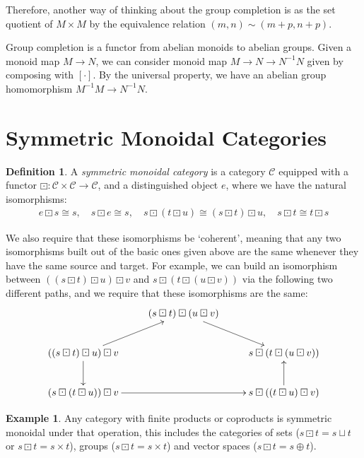 \documentclass[10pt,a4paper]{article}
\theoremstyle{definition}
\newtheorem{example}[theorem]{Example}
\newtheorem{definition}[theorem]{Definition}
\begin{document}
Therefore, another way of thinking about the group completion is as the set quotient of $M \times M$ by the equivalence relation $(m, n) \sim (m + p, n + p)$.

Group completion is a functor from abelian monoids to abelian groups. Given a monoid map $M \to N$, we can consider monoid map $M \to N \to N^{-1} N$ given by composing with $[\cdot]$. By the universal property, we have an abelian group homomorphism $M^{-1}M\to N^{-1}N$.

\section{Symmetric Monoidal Categories}
\begin{definition}
A \emph{symmetric monoidal category} is a category $\mathcal{C}$ equipped with a functor $\boxdot : \mathcal{C} \times \mathcal{C} \to \mathcal{C}$, and a distinguished object $e$, where we have the natural isomorphisms:
\begin{align*}
  e \boxdot s \cong s, \quad
  s \boxdot e \cong s, \quad
  s \boxdot (t \boxdot u) \cong (s \boxdot t) \boxdot u, \quad
  s \boxdot t \cong t \boxdot s
\end{align*}
\end{definition}

We also require that these isomorphisms be `coherent', meaning that any two isomorphisms built out of the basic ones given above are the same whenever they have the same source and target. For example, we can build an isomorphism between $((s \boxdot t) \boxdot u) \boxdot v$ and $s \boxdot (t \boxdot (u \boxdot v))$ via the following two different paths, and we require that these isomorphisms are the same:
\begin{displaymath}
    \xymatrix{
        & (s \boxdot t) \boxdot (u \boxdot v) \ar[dr] & \\
		((s \boxdot t) \boxdot u) \boxdot v \ar[ru] \ar[d] & & s \boxdot (t \boxdot (u \boxdot v)) \\
		(s \boxdot (t \boxdot u)) \boxdot v \ar[rr] & & s \boxdot ((t \boxdot u) \boxdot v) \ar[u]
    }
\end{displaymath}

\begin{example}
  Any category with finite products or coproducts is symmetric monoidal under that operation, this includes the categories of sets ($s \boxdot t = s \sqcup t$ or $s \boxdot t = s \times t$), groups ($s \boxdot t = s \times t$) and vector spaces ($s \boxdot t = s \oplus t$).
\end{example}
\end{document}
